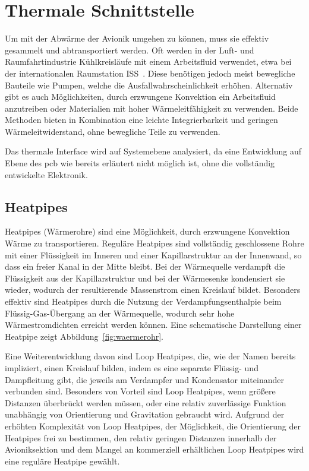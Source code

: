 \section{Thermale Schnittstelle}\label{sec:thermale_schnittstelle}

Um mit der Abwärme der Avionik umgehen zu können, muss sie effektiv gesammelt und abtransportiert werden.
Oft werden in der Luft- und Raumfahrtindustrie Kühlkreisläufe mit einem Arbeitsfluid verwendet, etwa bei der internationalen Raumstation ISS~\cite{ISS-ATCS}.
Diese benötigen jedoch meist bewegliche Bauteile wie Pumpen, welche die Ausfallwahrscheinlichkeit erhöhen. Alternativ gibt es auch
Möglichkeiten, durch erzwungene Konvektion ein Arbeitsfluid anzutreiben oder Materialien mit hoher Wärmeleitfähigkeit
zu verwenden. Beide Methoden bieten in Kombination eine leichte Integrierbarkeit und geringen Wärmeleitwiderstand,
ohne bewegliche Teile zu verwenden.

Das thermale Interface wird auf Systemebene analysiert, da eine Entwicklung auf Ebene des \ac{pcb} wie bereits erläutert nicht
möglich ist, ohne die vollständig entwickelte Elektronik.

\subsection{Heatpipes}\label{sec:waermerohre}

Heatpipes (Wärmerohre) sind eine Möglichkeit, durch erzwungene Konvektion Wärme zu transportieren. Reguläre Heatpipes
sind vollständig geschlossene Rohre mit einer Flüssigkeit im Inneren und einer Kapillarstruktur an der Innenwand,
so dass ein freier Kanal in der Mitte bleibt. Bei der Wärmequelle
verdampft die Flüssigkeit aus der Kapillarstruktur und bei der Wärmesenke kondensiert sie wieder, wodurch der resultierende Massenstrom einen
Kreislauf bildet. Besonders effektiv sind Heatpipes durch die Nutzung der Verdampfungsenthalpie beim Flüssig-Gas-Übergang an der Wärmequelle,
wodurch sehr hohe Wärmestromdichten erreicht werden können. Eine schematische Darstellung einer Heatpipe zeigt Abbildung~\ref{fig:waermerohr}.

Eine Weiterentwicklung davon sind Loop Heatpipes, die, wie der Namen bereits impliziert, einen Kreislauf bilden, indem es eine
separate Flüssig- und Dampfleitung gibt, die jeweils am Verdampfer und Kondensator miteinander verbunden sind.
Besonders von Vorteil sind Loop Heatpipes, wenn größere Distanzen überbrückt werden müssen, oder eine relativ zuverlässige
Funktion unabhängig von Orientierung und Gravitation gebraucht wird. Aufgrund der erhöhten Komplexität von Loop Heatpipes, der Möglichkeit,
die Orientierung der Heatpipes frei zu bestimmen, den relativ geringen Distanzen innerhalb der Avioniksektion und dem Mangel an kommerziell erhältlichen
Loop Heatpipes wird eine reguläre Heatpipe gewählt.


